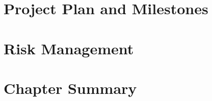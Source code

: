 \section{Project Plan and Milestones}
\label{sec:project-plan}

%

\section{Risk Management}
\label{sec:risk-management}




\section{Chapter Summary}
\label{sec:problem-summary}

